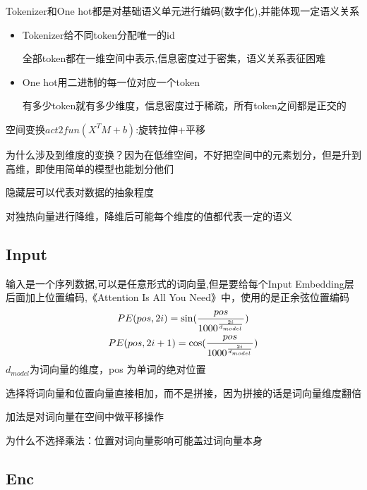 \documentclass[a4paper]{article}
\begin{document}
\begin{sloppypar}
      Tokenizer和One hot都是对基础语义单元进行编码(数字化),并能体现一定语义关系

      \begin{itemize}
            \item Tokenizer给不同token分配唯一的id

                  全部token都在一维空间中表示,信息密度过于密集，语义关系表征困难
            \item One hot用二进制的每一位对应一个token

                  有多少token就有多少维度，信息密度过于稀疏，所有token之间都是正交的
      \end{itemize}

      空间变换$act2fun(X^TM+b)$:旋转拉伸+平移

      为什么涉及到维度的变换？因为在低维空间，不好把空间中的元素划分，但是升到高维，即使用简单的模型也能划分他们

      隐藏层可以代表对数据的抽象程度

      对独热向量进行降维，降维后可能每个维度的值都代表一定的语义

      \subsection{Input}
      输入是一个序列数据,可以是任意形式的词向量,但是要给每个Input Embedding层后面加上位置编码,《Attention Is All You Need》中，使用的是正余弦位置编码
      \begin{gather}
            PE(pos,2i)=\sin (\frac{pos}{1000^{\frac{2i}{d_{model}}}})\\
            \newline
            PE(pos,2i+1)=\cos (\frac{pos}{1000^{\frac{2i}{d_{model}}}})
      \end{gather}
      $d_{model}$为词向量的维度，pos 为单词的绝对位置

      选择将词向量和位置向量直接相加，而不是拼接，因为拼接的话是词向量维度翻倍

      加法是对词向量在空间中做平移操作

      为什么不选择乘法：位置对词向量影响可能盖过词向量本身

      \subsection{Enc}
      \newpage


\end{sloppypar}
\end{document}
